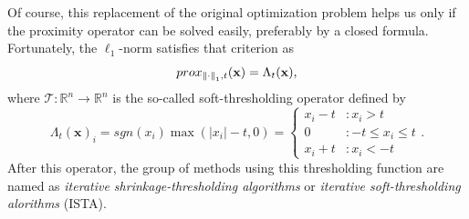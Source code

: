 Of course, this replacement of the original optimization problem helps us only if the proximity operator can be solved easily, preferably by a closed formula. Fortunately, the $\ell_1$-norm satisfies that criterion as
\[prox_{\left\lVert\cdot\right\rVert_1, t}(\mathbf{x}) = \Lambda_t(\mathbf{x}),\]
where $\mathcal{T}:\mathbb{R}^n \rightarrow \mathbb{R}^n$ is the so-called soft-thresholding operator defined by
\[\Lambda_t(\mathbf{x})_i = sgn(x_i) \max(|x_i| - t, 0) = \begin{cases}x_i - t & : x_i > t \\ 0 & : -t \le x_i \le t \\ x_i + t & : x_i < -t\end{cases}.\]
After this operator, the group of methods using this thresholding function are named as \textit{iterative shrinkage-thresholding algorithms} or \textit{iterative soft-thresholding alorithms} (ISTA).

